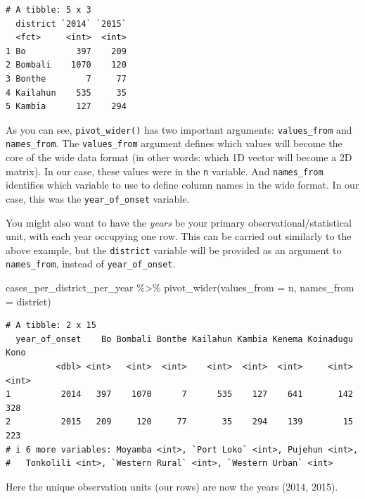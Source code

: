 \documentclass[
  letterpaper,
  DIV=11,
  numbers=noendperiod]{scrreprt}
\newenvironment{Shaded}{\begin{snugshade}}{\end{snugshade}}
\newcommand{\AttributeTok}[1]{\textcolor[rgb]{0.40,0.45,0.13}{#1}}
\newcommand{\FunctionTok}[1]{\textcolor[rgb]{0.28,0.35,0.67}{#1}}
\newcommand{\NormalTok}[1]{\textcolor[rgb]{0.00,0.23,0.31}{#1}}
\newcommand{\SpecialCharTok}[1]{\textcolor[rgb]{0.37,0.37,0.37}{#1}}
\begin{document}
\begin{verbatim}
# A tibble: 5 x 3
  district `2014` `2015`
  <fct>     <int>  <int>
1 Bo          397    209
2 Bombali    1070    120
3 Bonthe        7     77
4 Kailahun    535     35
5 Kambia      127    294
\end{verbatim}

As you can see, \texttt{pivot\_wider()} has two important arguments:
\texttt{values\_from} and \texttt{names\_from}. The
\texttt{values\_from} argument defines which values will become the core
of the wide data format (in other words: which 1D vector will become a
2D matrix). In our case, these values were in the \texttt{n} variable.
And \texttt{names\_from} identifies which variable to use to define
column names in the wide format. In our case, this was the
\texttt{year\_of\_onset} variable.

\begin{tcolorbox}[enhanced jigsaw, titlerule=0mm, colback=white, left=2mm, breakable, opacitybacktitle=0.6, colbacktitle=quarto-callout-note-color!10!white, colframe=quarto-callout-note-color-frame, bottomtitle=1mm, opacityback=0, coltitle=black, arc=.35mm, toptitle=1mm, title=\textcolor{quarto-callout-note-color}{\faInfo}\hspace{0.5em}{Side Note}, leftrule=.75mm, toprule=.15mm, bottomrule=.15mm, rightrule=.15mm]

You might also want to have the \emph{years} be your primary
observational/statistical unit, with each year occupying one row. This
can be carried out similarly to the above example, but the
\texttt{district} variable will be provided as an argument to
\texttt{names\_from}, instead of \texttt{year\_of\_onset}.

\begin{Shaded}
\begin{Highlighting}[]
\NormalTok{cases\_per\_district\_per\_year }\SpecialCharTok{\%\textgreater{}\%} 
  \FunctionTok{pivot\_wider}\NormalTok{(}\AttributeTok{values\_from =}\NormalTok{ n, }
              \AttributeTok{names\_from =}\NormalTok{ district)}
\end{Highlighting}
\end{Shaded}

\begin{verbatim}
# A tibble: 2 x 15
  year_of_onset    Bo Bombali Bonthe Kailahun Kambia Kenema Koinadugu  Kono
          <dbl> <int>   <int>  <int>    <int>  <int>  <int>     <int> <int>
1          2014   397    1070      7      535    127    641       142   328
2          2015   209     120     77       35    294    139        15   223
# i 6 more variables: Moyamba <int>, `Port Loko` <int>, Pujehun <int>,
#   Tonkolili <int>, `Western Rural` <int>, `Western Urban` <int>
\end{verbatim}

Here the unique observation units (our rows) are now the years (2014,
2015).

\end{tcolorbox}
\end{document}
